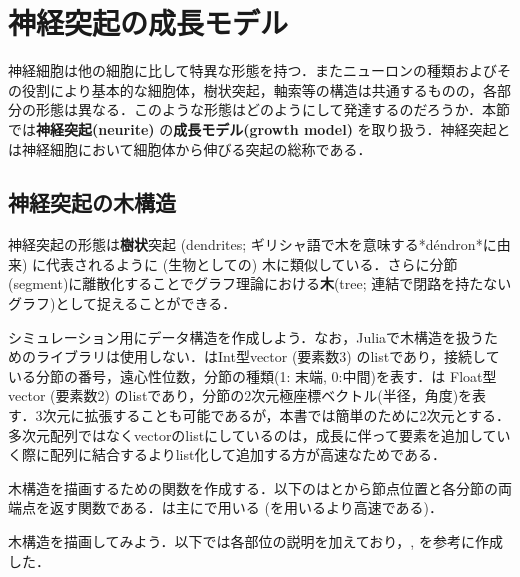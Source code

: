 \section{神経突起の成長モデル}
神経細胞は他の細胞に比して特異な形態を持つ．またニューロンの種類およびその役割により基本的な細胞体，樹状突起，軸索等の構造は共通するものの，各部分の形態は異なる．このような形態はどのようにして発達するのだろうか．本節では\textbf{神経突起(neurite)} の\textbf{成長モデル(growth model)} を取り扱う．神経突起とは神経細胞において細胞体から伸びる突起の総称である．
\subsection{神経突起の木構造}
神経突起の形態は\textbf{樹状}突起 (dendrites; ギリシャ語で木を意味する*déndron*に由来) に代表されるように (生物としての) 木に類似している．さらに分節(segment)に離散化することでグラフ理論における\textbf{木}(tree; 連結で閉路を持たないグラフ)として捉えることができる．

シミュレーション用にデータ構造を作成しよう．なお，Juliaで木構造を扱うためのライブラリは使用しない．はInt型vector (要素数3) のlistであり，接続している分節の番号，遠心性位数，分節の種類(1: 末端, 0:中間)を表す．は Float型vector (要素数2) のlistであり，分節の2次元極座標ベクトル(半径，角度)を表す．3次元に拡張することも可能であるが，本書では簡単のために2次元とする．多次元配列ではなくvectorのlistにしているのは，成長に伴って要素を追加していく際に配列に結合するよりlist化して追加する方が高速なためである．


木構造を描画するための関数を作成する．以下のはとから節点位置と各分節の両端点を返す関数である．は主にで用いる (を用いるより高速である)．


木構造を描画してみよう．以下では各部位の説明を加えており，\cite{Koene2009-hv}, \cite{Cuntz2010-in}を参考に作成した．



